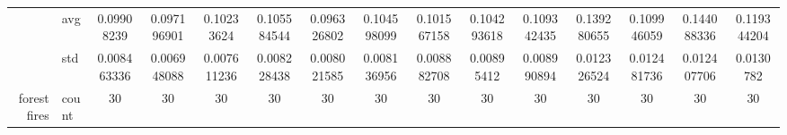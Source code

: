 \begin{table}[htbp]
{\begin{tabular}{rlccc|c|c|c|c|c|ccccc}
			                                                                               & avg                & \cellcolor[rgb]{ .588,  .8,  .49}0.09908239                                    & \cellcolor[rgb]{ .451,  .761,  .482}0.097196901                                & \cellcolor[rgb]{ .831,  .871,  .506}0.10233624                                 & \cellcolor[rgb]{ 1,  .91,  .518}0.105584544     & \cellcolor[rgb]{ .388,  .745,  .482}\textcolor[rgb]{ 0,  .38,  0}{0.096326802} & \cellcolor[rgb]{ 1,  .922,  .518}0.104598099    & \cellcolor[rgb]{ .773,  .855,  .502}0.101567158                                & \cellcolor[rgb]{ .976,  .914,  .514}0.104293618 & \cellcolor[rgb]{ 1,  .863,  .506}0.109342435    & \cellcolor[rgb]{ .976,  .475,  .435}0.139280655 & \cellcolor[rgb]{ 1,  .855,  .506}0.109946059    & \cellcolor[rgb]{ .973,  .412,  .42}0.144088336  & \cellcolor[rgb]{ .992,  .733,  .482}0.119344204 \\
			                                                                               & std                & 0.008463336                                                                    & 0.006948088                                                                    & 0.007611236                                                                    & 0.008228438                                     & 0.008021585                                                                    & 0.008136956                                     & 0.008882708                                                                    & 0.00895412                                      & 0.008990894                                     & 0.012326524                                     & 0.012481736                                     & 0.012407706                                     & 0.0130782                                       \\
			forest fires                                                                   & count              & 30                                                                             & 30                                                                             & 30                                                                             & 30                                              & 30                                                                             & 30                                              & 30                                                                             & 30                                              & 30                                              & 30                                              & 30                                              & 30                                              & 30                                              \\

\end{tabular}}
\end{table}
